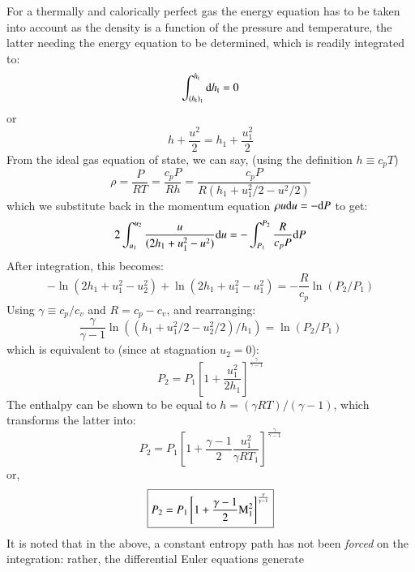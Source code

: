 \documentclass{warpdoc}
\numberwithin{equation}{section}
\newcommand{\Cv}{{c_{v}}}
\newcommand{\Cp}{{c_{p}}}
\newcommand{\mfd}{\displaystyle}
\newcommand{\ordi}{{\rm d}}
\newcommand{\bigfrac}{\mfd\frac}
\newcommand\frameeqn[1]{\fbox{$#1$}}
\begin{document}
For a thermally and calorically perfect gas the energy equation
has to be taken into account as the density is a function of the
pressure and temperature, the latter needing the energy equation
to be determined, which is readily integrated to:
%
\begin{equation}
  \int_{{(h_{\rm t})}_1}^{h_{\rm t}} \ordi h_{\rm t} =0
\end{equation}
%
or
%
\begin{equation}
  h + \bigfrac{u^2}{2} = h_1 + \bigfrac{u_1^2}{2}
\end{equation}
%
From the ideal gas equation of state, we can say, (using the definition
$h\equiv \Cp T$)
%
\begin{equation}
  \rho=\bigfrac{P}{RT}=\bigfrac{\Cp P}{Rh}
      =\bigfrac{\Cp P}{R(h_1+u_1^2/2-u^2/2)}
\end{equation}
%
which we substitute back in the momentum equation $ \rho u \ordi u =-\ordi P$
to get:
%
\begin{equation}
  2 \int_{u_1}^{u_2} \bigfrac{u}{(2 h_1+u_1^2-u^2)}  \ordi u
  =-\int_{P_1}^{P_2} \frac{R}{\Cp P}\ordi P
\end{equation}
%
After integration, this becomes:
%
\begin{equation}
  -\ln (2 h_1+u_1^2-u_2^2)
  +\ln (2 h_1+u_1^2-u_1^2)
  =- \frac{R}{\Cp}\ln (P_2/P_1)
\end{equation}
%
Using $\gamma \equiv \Cp/\Cv$ and $R=\Cp-\Cv$, and rearranging:
%
\begin{equation}
   \frac{\gamma}{\gamma-1} \ln ((h_1+u_1^2/2-u_2^2/2)/h_1)
  =\ln (P_2/P_1)
\end{equation}
%
which is equivalent to (since at stagnation $u_2=0$):
%
\begin{equation}
P_2=P_1 \left[  1+\frac{u_1^2}{2 h_1} \right]^\frac{\gamma}{\gamma-1}
\end{equation}
%
The enthalpy can be shown to be equal to $h=(\gamma R T)/(\gamma-1)$,
which transforms the latter into:
%
\begin{equation}
P_2=P_1 \left[  1+\frac{\gamma-1}{2} \frac{u_1^2}{\gamma R T_1} \right]^\frac{\gamma}{\gamma-1}
\end{equation}
%
or,
%
\begin{equation}
  \frameeqn{
    \mfd P_2=P_1 \left[  1+\frac{\gamma-1}{2} {\rm M}_1^2 \right]^\frac{\gamma}{\gamma-1}
  }
\end{equation}
%
It is noted that in the above, a constant entropy path has not been \emph{forced}
on the integration: rather, the differential Euler equations generate
\end{document}
